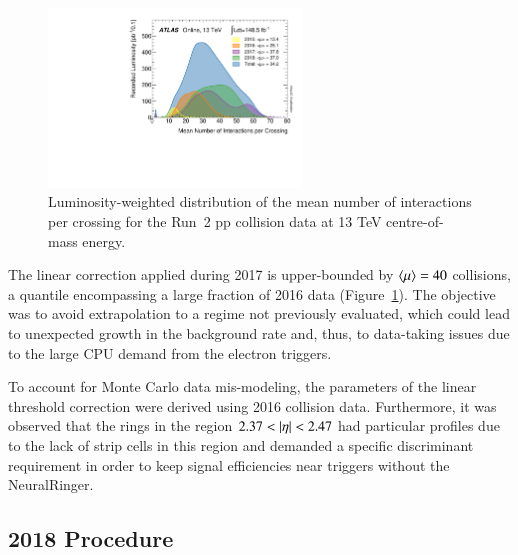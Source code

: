 



%
%



\begin{figure}[h!t]
\centering
\includegraphics[width=0.6\textwidth]{sections/tuning_strategy/figures/mu_2015_2018.pdf}
\caption{\label{fig:mu_2015_2018}
Luminosity-weighted distribution of the mean number of interactions per crossing
for the Run~2 pp collision data at 13 TeV centre-of-mass
energy.~\cite{atlas_lumi_run2_results}}
\end{figure}


The linear correction applied during 2017 is upper-bounded by $\langle \mu \rangle=40$
collisions, a quantile encompassing a large fraction of 2016 data
(Figure~\ref{fig:mu_2015_2018}). The objective was to avoid extrapolation to a
regime not previously evaluated, which could lead to unexpected growth in the
background rate and, thus, to data-taking issues due to the large CPU demand
from the electron triggers.

To account for Monte Carlo data mis-modeling, the parameters of the linear threshold
correction were derived using 2016 collision data. Furthermore, it was observed
that the rings in the region $2.37<\abseta<2.47$ had particular profiles due to
the lack of strip cells in this region and demanded a specific discriminant requirement in order to keep signal efficiencies near triggers without the NeuralRinger. 

\FloatBarrier
\subsection{2018 Procedure}\label{ssec:2018}

